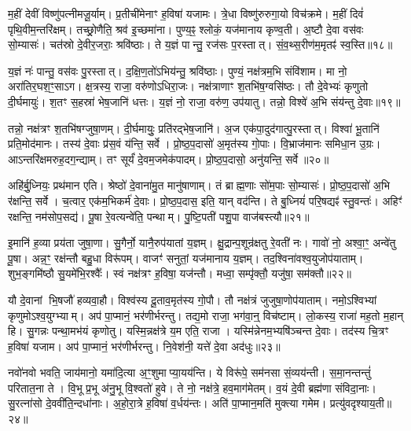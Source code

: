 म॒हीं देवीं विष्णु॑पत्नीमजू॒र्याम्।
प्र॒तीची॑मेनाꣳ ह॒विषा॑ यजामः।
त्रे॒धा विष्णु॑रुरुगा॒यो विच॑क्रमे।
म॒हीं दिवं॑ पृथि॒वीम॒न्तरि॑क्षम्।
तच्छ्रो॒णैति॒ श्रव॑ इ॒च्छमा॑ना।
पुण्य॒ꣴ॒ श्लोकं॒ यज॑मानाय कृण्व॒ती।
अ॒ष्टौ दे॒वा वस॑वः सो॒म्यासः॑।
चत॑स्रो दे॒वीर॒जराः॒ श्रवि॑ष्ठाः।
ते य॒ज्ञं पान्तु॒ रज॑सः प॒रस्तात्।
सं॒व॒थ्स॒रीण॑म॒मृतꣴ॑ स्व॒स्ति॥१८॥

य॒ज्ञं नः॑ पान्तु॒ वस॑वः पु॒रस्तात्।
द॒क्षि॒ण॒तो॑\-ऽभिय॑न्तु॒ श्रवि॑ष्ठाः।
पुण्यं॒ नक्ष॑त्रम॒भि संवि॑शाम।
मा नो॒ अरा॑तिर॒घश॒ꣳ॒सा\-ऽग\sn{}।
क्ष॒त्रस्य॒ राजा॒ वरु॑णो\-ऽधिरा॒जः।
नक्ष॑त्राणाꣳ श॒तभि॑ष॒ग्वसि॑ष्ठः।
तौ दे॒वेभ्यः॑ कृणुतो दी॒र्घमायुः॑।
श॒तꣳ स॒हस्रा॑ भेष॒जानि॑ धत्तः।
य॒ज्ञं नो॒ राजा॒ वरु॑ण॒ उप॑यातु।
तन्नो॒ विश्वे॑ अ॒भि संय॑न्तु दे॒वाः॥१९॥

तन्नो॒ नक्ष॑त्रꣳ श॒तभि॑षग्जुषा॒णम्।
दी॒र्घमायुः॒ प्रति॑रद्भेष॒जानि॑।
अ॒ज एक॑पा॒दुद॑गात्पु॒रस्तात्।
विश्वा॑ भू॒तानि॑ प्रति॒मोद॑मानः।
तस्य॑ दे॒वाः प्र॑स॒वं य॑न्ति॒ सर्वे।
प्रो॒ष्ठ॒प॒दासो॑ अ॒मृत॑स्य गो॒पाः।
वि॒भ्राज॑मानः समिधा॒न उ॒ग्रः।
आऽन्तरि॑क्षमरुह॒दग॒न्द्याम्।
तꣳ सूर्यं॑ दे॒वम॒जमेक॑पादम्।
प्रो॒ष्ठ॒प॒दासो॒ अनु॑यन्ति॒ सर्वे॥२०॥

अहि॑र्बु॒ध्नियः॒ प्रथ॑मान एति।
श्रेष्ठो॑ दे॒वाना॑मु॒त मानु॑षाणाम्।
तं ब्राह्म॒णाः सो॑म॒पाः सो॒म्यासः॑।
प्रो॒ष्ठ॒प॒दासो॑ अ॒भि र॑क्षन्ति॒ सर्वे।
च॒त्वार॒ एक॑म॒भिकर्म॑ दे॒वाः।
प्रो॒ष्ठ॒प॒दास॒ इति॒ यान् वद॑न्ति।
ते बु॒ध्नियं॑ परि॒षद्यꣴ॑ स्तु॒वन्तः॑।
अहिꣳ॑ रक्षन्ति॒ नम॑सोप॒सद्य॑।
पू॒षा रे॒वत्यन्वे॑ति॒ पन्थाम्।
पु॒ष्टि॒पती॑ पशु॒पा वाज॑बस्त्यौ॥२१॥

इ॒मानि॑ ह॒व्या प्रय॑ता जुषा॒णा।
सु॒गैर्नो॒ यानै॒रुप॑यातां य॒ज्ञम्।
क्षु॒द्रान्प॒शून्र॑क्षतु रे॒वती॑ नः।
गावो॑ नो॒ अश्वा॒ꣳ॒ अन्वे॑तु पू॒षा।
अन्न॒ꣳ॒ रक्ष॑न्तौ बहु॒धा विरू॑पम्।
वाजꣳ॑ सनुतां॒ यज॑मानाय य॒ज्ञम्।
तद॒श्विना॑वश्व॒युजोप॑याताम्।
शुभ॒ङ्गमि॑ष्ठौ सु॒यमे॑भि॒रश्वैः᳚।
स्वं नक्ष॑त्रꣳ ह॒विषा॒ यज॑न्तौ।
मध्वा॒ सम्पृ॑क्तौ॒ यजु॑षा॒ सम॑क्तौ॥२२॥

यौ दे॒वानां भि॒षजौ॑ हव्यवा॒हौ।
विश्व॑स्य दू॒ताव॒मृत॑स्य गो॒पौ।
तौ नक्ष॑त्रं जुजुषा॒णोप॑याताम्।
नमो॒ऽश्विभ्यां कृणुमो\-ऽश्व॒युग्भ्याम्।
अप॑ पा॒प्मानं॒ भर॑णीर्भरन्तु।
तद्य॒मो राजा॒ भग॑वा॒न्॒ विच॑ष्टाम्।
लो॒कस्य॒ राजा॑ मह॒तो म॒हान् हि।
सु॒गन्नः पन्था॒मभ॑यं कृणोतु।
यस्मि॒न्नक्ष॑त्रे य॒म एति॒ राजा।
यस्मि॑न्नेनम॒भ्यषि॑ञ्चन्त दे॒वाः।
तद॑स्य चि॒त्रꣳ ह॒विषा॑ यजाम।
अप॑ पा॒प्मानं॒ भर॑णीर्भरन्तु।
नि॒वेश॑नी॒ यत्ते॑ दे॒वा अद॑धुः॥२३॥\anuvakamend[त॒तार॒ मह्यं॑ प्रास॒चीर्या यान्तु य॒ज्ञं वाचꣴ॑ स्व॒स्ति दे॒वा अनु॑यन्ति॒ सर्वे॒ वाज॑बस्त्यौ॒ सम॑क्तौ दे॒वास्त्रीणि॑ च]

नवो॑नवो भवति॒ जाय॑मानो॒ यमा॑दि॒त्या अ॒ꣳ॒शुमाप्या॒यय॑न्ति।
ये विरू॑पे॒ सम॑नसा सं॒व्यय॑न्ती।
स॒मा॒नन्तन्तुं॑ परितात॒ना ते।
वि॒भू प्र॒भू अ॑नु॒भू वि॒श्वतो॑ हुवे।
ते नो॒ नक्ष॑त्रे॒ हव॒माग॑मेतम्।
व॒यं दे॒वी ब्रह्म॑णा संविदा॒नाः।
सु॒रत्ना॑सो दे॒ववी॑ति॒न्दधा॑नाः।
अ॒हो॒रा॒त्रे ह॒विषा॑ व॒र्धय॑न्तः।
अति॑ पा॒प्मान॒मति॑ मुक्त्या गमेम।
प्रत्यु॑वदृश्याय॒ती॥२४॥

